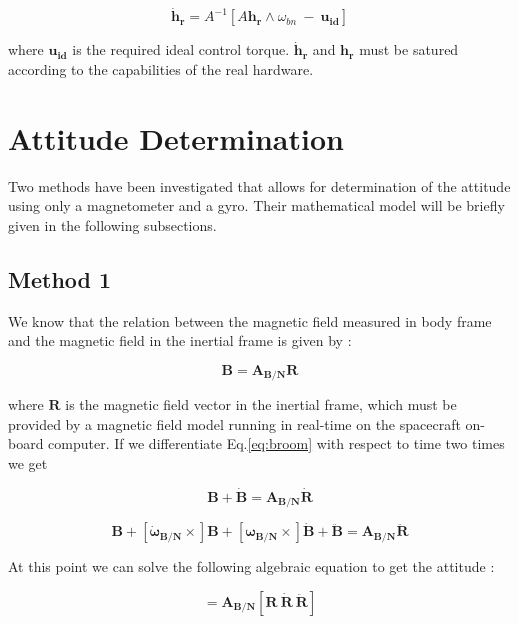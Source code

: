 \documentclass[11pt,a4paper]{report}
\begin{document}
\begin{equation}
 \mathbf{\dot{h}_r} = \mathit{A}^{-1} [A\mathbf{h_r} \wedge \omega_{bn} \ - \ \mathbf{u_{id}}]
\end{equation}

where $\mathbf{u_{id}}$ is the required ideal control torque. 
$\mathbf{\dot{h}_r}$ and $\mathbf{{h}_r}$ must be satured according to the capabilities of the real hardware.

\chapter{Attitude Determination} 
\label{chap:determination}
Two methods have been investigated that allows for determination of the attitude using only a magnetometer and a gyro. Their mathematical model will be briefly given in the following subsections.

\section{Method 1}
We know that the relation between the magnetic field measured in body frame and the magnetic field in the inertial frame is given by : 

\begin{equation}
 \label{eq:broom}
 \mathbf{B}=\mathbf{A_{B/N}}\mathbf{R}
\end{equation}

where $\mathbf{R}$ is the magnetic field vector in the inertial frame, which must be provided by a magnetic field model running in real-time on the spacecraft on-board computer.
If we differentiate Eq.\ref{eq:broom} with respect to time two times we get 

\begin{equation}
 [\mathbf{\omega_{B/N}} \times]\mathbf{B} + \mathbf{\dot{B}}=\mathbf{A_{B/N}}\mathbf{\dot{R}}
\end{equation}

\begin{equation}
 [\mathbf{\omega_{B/N}} \times][\mathbf{\omega_{B/N}} \times]\mathbf{B} + [\mathbf{\dot{\omega}_{B/N}} \times]\mathbf{B} + [\mathbf{\omega_{B/N}} \times]\mathbf{\dot{B}} + \mathbf{\ddot{B}}=\mathbf{A_{B/N}}\mathbf{\ddot{R}}
\end{equation}

At this point we can solve the following algebraic equation to get the attitude : 

\begin{equation}
[\mathbf{B} \ \mathbf{S_{1}} \ \mathbf{S_{2}}]=\mathbf{A_{B/N}}[\mathbf{R} \ \mathbf{\dot{R}} \ \mathbf{\ddot{R}}]
\end{equation}
\end{document}
